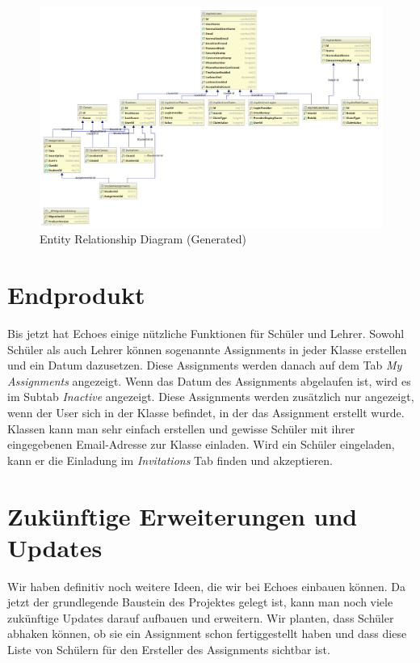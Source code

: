 \documentclass[a4paper, titlepage]{article}
\begin{document}
    \begin{figure}
        \includegraphics[width=\textwidth]{uml2}
        \caption{Entity Relationship Diagram (Generated)}
    \end{figure}

    \section{Endprodukt}
    Bis jetzt hat Echoes einige nützliche Funktionen für Schüler und Lehrer. Sowohl Schüler als auch Lehrer können sogenannte Assignments 
    in jeder Klasse erstellen und ein Datum dazusetzen. Diese Assignments werden danach auf dem Tab \emph{My Assignments} angezeigt. 
    Wenn das Datum des Assignments abgelaufen ist, wird es im Subtab \emph{Inactive} angezeigt. Diese Assignments werden zusätzlich nur angezeigt, 
    wenn der User sich in der Klasse befindet, in der das Assignment erstellt wurde. Klassen kann man sehr einfach erstellen und gewisse Schüler 
    mit ihrer eingegebenen Email-Adresse zur Klasse einladen. Wird ein Schüler eingeladen, kann er die Einladung im \emph{Invitations} Tab 
    finden und akzeptieren.
    
    \section{Zukünftige Erweiterungen und Updates}
    Wir haben definitiv noch weitere Ideen, die wir bei Echoes einbauen können. Da jetzt der grundlegende Baustein des Projektes gelegt ist, kann man noch viele zukünftige Updates darauf aufbauen und erweitern. Wir planten, dass Schüler abhaken können, ob sie ein Assignment schon fertiggestellt haben und dass diese Liste von Schülern für den Ersteller des Assignments sichtbar ist.
    


    \newpage
  
\end{document}
